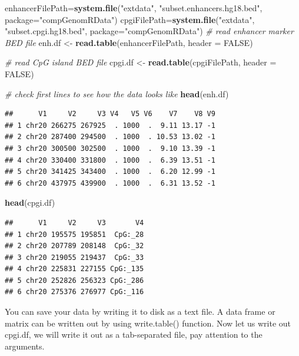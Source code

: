 \documentclass[12pt,]{krantz}
\newenvironment{Shaded}{\begin{snugshade}}{\end{snugshade}}
\newcommand{\CommentTok}[1]{\textcolor[rgb]{0.56,0.35,0.01}{\textit{#1}}}
\newcommand{\DataTypeTok}[1]{\textcolor[rgb]{0.13,0.29,0.53}{#1}}
\newcommand{\KeywordTok}[1]{\textcolor[rgb]{0.13,0.29,0.53}{\textbf{#1}}}
\newcommand{\NormalTok}[1]{#1}
\newcommand{\OtherTok}[1]{\textcolor[rgb]{0.56,0.35,0.01}{#1}}
\newcommand{\StringTok}[1]{\textcolor[rgb]{0.31,0.60,0.02}{#1}}
\begin{document}
\begin{Shaded}
\begin{Highlighting}[]
\NormalTok{enhancerFilePath=}\KeywordTok{system.file}\NormalTok{(}\StringTok{"extdata"}\NormalTok{,}
                \StringTok{"subset.enhancers.hg18.bed"}\NormalTok{,}
                \DataTypeTok{package=}\StringTok{"compGenomRData"}\NormalTok{)}
\NormalTok{cpgiFilePath=}\KeywordTok{system.file}\NormalTok{(}\StringTok{"extdata"}\NormalTok{,}
                \StringTok{"subset.cpgi.hg18.bed"}\NormalTok{,}
                \DataTypeTok{package=}\StringTok{"compGenomRData"}\NormalTok{)}
\CommentTok{# read enhancer marker BED file}
\NormalTok{enh.df <-}\StringTok{ }\KeywordTok{read.table}\NormalTok{(enhancerFilePath, }\DataTypeTok{header =} \OtherTok{FALSE}\NormalTok{) }

\CommentTok{# read CpG island BED file}
\NormalTok{cpgi.df <-}\StringTok{ }\KeywordTok{read.table}\NormalTok{(cpgiFilePath, }\DataTypeTok{header =} \OtherTok{FALSE}\NormalTok{) }

\CommentTok{# check first lines to see how the data looks like}
\KeywordTok{head}\NormalTok{(enh.df)}
\end{Highlighting}
\end{Shaded}

\begin{verbatim}
##      V1     V2     V3 V4   V5 V6    V7    V8 V9
## 1 chr20 266275 267925  . 1000  .  9.11 13.17 -1
## 2 chr20 287400 294500  . 1000  . 10.53 13.02 -1
## 3 chr20 300500 302500  . 1000  .  9.10 13.39 -1
## 4 chr20 330400 331800  . 1000  .  6.39 13.51 -1
## 5 chr20 341425 343400  . 1000  .  6.20 12.99 -1
## 6 chr20 437975 439900  . 1000  .  6.31 13.52 -1
\end{verbatim}

\begin{Shaded}
\begin{Highlighting}[]
\KeywordTok{head}\NormalTok{(cpgi.df)}
\end{Highlighting}
\end{Shaded}

\begin{verbatim}
##      V1     V2     V3       V4
## 1 chr20 195575 195851  CpG:_28
## 2 chr20 207789 208148  CpG:_32
## 3 chr20 219055 219437  CpG:_33
## 4 chr20 225831 227155 CpG:_135
## 5 chr20 252826 256323 CpG:_286
## 6 chr20 275376 276977 CpG:_116
\end{verbatim}

You can save your data by writing it to disk as a text file. A data frame or matrix can be written out by using write.table() function. Now let us write out cpgi.df, we will write it out as a tab-separated file, pay attention to the arguments.
\end{document}
